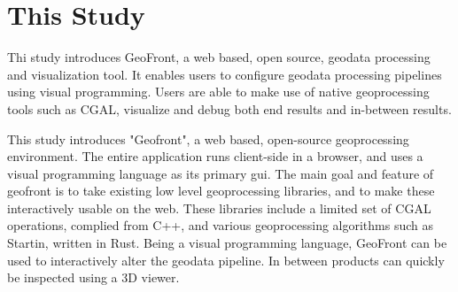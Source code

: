 \section{This Study}

Thi study introduces GeoFront, a web based, open source, geodata processing and visualization tool. 
It enables users to configure geodata processing pipelines using visual programming. 
Users are able to make use of native geoprocessing tools such as CGAL, visualize and debug both end results and in-between results.


This study introduces "Geofront", a web based, open-source geoprocessing environment. 
The entire application runs client-side in a browser, and uses a visual programming language as its primary \ac{gui}.
The main goal and feature of geofront is to take existing low level geoprocessing libraries, and to make these interactively usable on the web. 
These libraries include a limited set of CGAL operations, complied from C++, and various geoprocessing algorithms such as Startin, written in Rust. 
Being a visual programming language, GeoFront can be used to interactively alter the geodata pipeline. 
In between products can quickly be inspected using a 3D viewer.


















